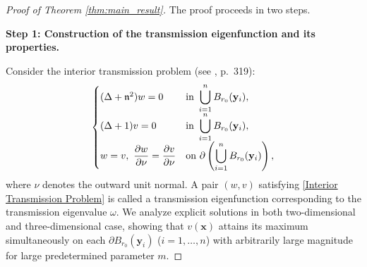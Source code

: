 \documentclass[11pt,reqno,oneside]{amsart}
\numberwithin{equation}{section}
\theoremstyle{definition}
\theoremstyle{remark}
\numberwithin{equation}{section}
\begin{document}
	\begin{proof}[Proof of Theorem \ref{thm:main_result}]
		The proof proceeds in two steps.
		
		\medskip
		\textbf{Step 1: Construction of the transmission eigenfunction and its properties.}
		
		Consider the interior transmission problem (see \cite{ColtonKress}, p.~319):
		\begin{equation}\label{Interior Transmission Problem}
			\left\{\begin{array}{@{}ll@{}}
				(\Delta +  \mathfrak{n}^2) w = 0 & \text{in } \displaystyle\bigcup_{i=1}^{n} B_{r_0}(\mathbf{y}_i), \\
				(\Delta + 1) v = 0 & \text{in } \displaystyle\bigcup_{i=1}^{n} B_{r_0}(\mathbf{y}_i), \\
				w = v,\ \dfrac{\partial w}{\partial \nu} = \dfrac{\partial v}{\partial \nu} & \text{on } \partial\left(\displaystyle\bigcup_{i=1}^{n} B_{r_0}(\mathbf{y}_i)\right),
			\end{array}\right.
		\end{equation}
		where $\nu$ denotes the outward unit normal. A pair $(w,v)$ satisfying \eqref{Interior Transmission Problem} is called a transmission eigenfunction corresponding to the transmission eigenvalue $\omega$. We analyze explicit solutions in both two-dimensional  and three-dimensional case, showing that $v(\mathbf{x})$ attains its maximum simultaneously on each $\partial B_{r_0}(\mathbf{y}_i)$ ($i=1,\dots,n$) with arbitrarily large magnitude for large predetermined parameter $m$.
		

\end{proof}
\end{document}
